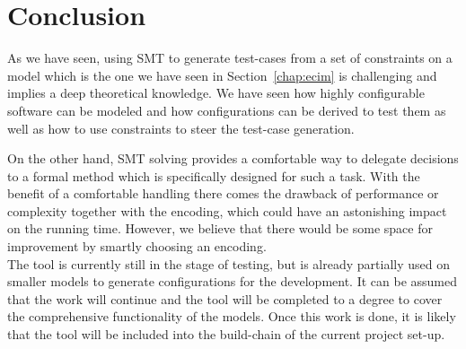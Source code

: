 \chapter{Conclusion}\label{chap:conclusion}

As we have seen, using SMT to generate test-cases from a set of constraints on a model which is the one we have seen in Section~\ref{chap:ecim} is challenging and implies a deep theoretical knowledge. We have seen how highly configurable software can be modeled and how configurations can be derived to test them as well as how to use constraints to steer the test-case generation. 

On the other hand, SMT solving provides a comfortable way to delegate decisions to a formal method which is specifically designed for such a task. With the benefit of a comfortable handling there comes the drawback of performance or complexity together with the encoding, which could have an astonishing impact on the running time. However, we believe that there would be some space for improvement by smartly choosing an encoding. \\

The tool is currently still in the stage of testing, but is already partially used on smaller models to generate configurations for the development. It can be assumed that the work will continue and the tool will be completed to a degree to cover the comprehensive functionality of the models. Once this work is done, it is likely that the tool will be included into the build-chain of the current project set-up.